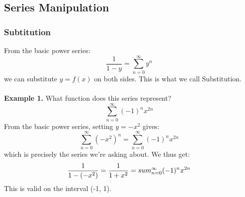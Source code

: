 \documentclass{article}
\begin{document}
\subsection{Series Manipulation}
\subsubsection{Subtitution}
From the basic power series: 
$$ \frac{1}{1-y} = \sum_{n=0}^{\infty} y^n$$ 
we can substitute $ y = f(x) $ on both sides. This is what we call Substitution. \\ \\ 
\textbf{Example 1.} What function does this series represent?
$$ \sum_{n=0}^{\infty} (-1)^n x^{2n}$$
From the basic power series, setting $ y = -x^2$ gives: 
$$ \sum_{n=0}^{\infty} (-x^2)^n =  \sum_{n=0}^{\infty} (-1)^n x^{2n}$$
which is precisely the series we're asking about. We thus get: 
$$ \frac{1}{1-(-x^2)} =  \frac{1}{1+x^2} = \\sum_{n=0}^{\infty} (-1)^n x^{2n}$$
This is valid on the interval (-1, 1). 
\end{document}
